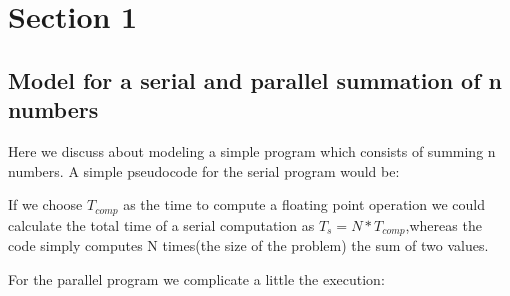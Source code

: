 \documentclass[11pt]{scrartcl} %
\begin{document}


\section{Section 1}

\subsection{Model for a serial and parallel summation of n numbers}
Here we discuss about modeling a simple program which consists of summing n numbers.
A simple pseudocode for the serial program would be:


\begin{algorithmic}

  \ENDFOR
{}
\end{algorithmic}

If we choose $T_{comp}$ as the time to compute a floating point operation we could calculate the total time of a serial computation as
$T_s = N * T_{comp}$,whereas the code simply computes N times(the size of the problem) the sum of two values.

For the parallel program we complicate a little the execution:

\begin{algorithmic}


		  \ENDFOR
		  \ENDFOR
\ENDIF
{}
	  \ENDFOR
\ENDIF
{}
\end{algorithmic}
\end{document}
